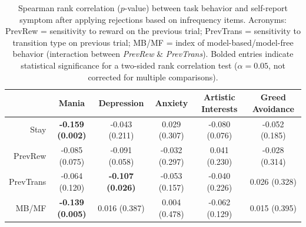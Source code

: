 \documentclass[a4paper,notitlepage,12pt]{article}
\begin{document}
\begin{refsection}[supp]
\begin{table}[H]
    \centering
    \begin{adjustbox}{center}   
    \small
    \begin{tabular}{rccccc}
        \toprule
        {} & Mania & Depression & Anxiety & Artistic Interests & Greed Avoidance \\
        \midrule
        Stay      &  \textbf{-0.159 (0.002)} &           -0.043 (0.211) &   0.029 (0.307) &  -0.080 (0.076) &  -0.052 (0.185) \\
        PrevRew   &           -0.085 (0.075) &           -0.091 (0.058) &  -0.032 (0.297) &   0.041 (0.230) &  -0.028 (0.314) \\
        PrevTrans &           -0.064 (0.120) &  \textbf{-0.107 (0.026)} &  -0.053 (0.157) &  -0.040 (0.226) &   0.026 (0.328) \\
        MB/MF     &  \textbf{-0.139 (0.005)} &            0.016 (0.387) &   0.004 (0.478) &  -0.062 (0.129) &   0.015 (0.395) \\
        \bottomrule
    \end{tabular}
    \end{adjustbox}
    \caption{Spearman rank correlation ($p$-value) between task behavior and self-report symptom after applying rejections based on infrequency items. Acronyms: PrevRew = sensitivity to reward on the previous trial; PrevTrans = sensitivity to transition type on previous trial; MB/MF = index of model-based/model-free behavior (interaction between \textit{PrevRew} \& \textit{PrevTrans}). Bolded entries indicate statistical significance for a two-sided rank correlation test ($\alpha = 0.05$, not corrected for multiple comparisons).}
\end{table}


\end{refsection}
\end{document}
